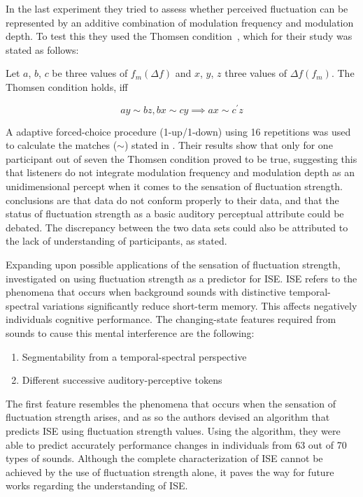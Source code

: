 \documentclass[../main.tex]{subfiles}
\begin{document}
\begin{theoreticalbackground}
In the last experiment they tried to assess whether perceived fluctuation can be
represented by an additive combination of modulation frequency and modulation
depth. To test this they used the Thomsen condition~\cite{Falmagne1976}, which
for their study was stated as follows:

\begin{mdframed}

  Let $a$, $b$, $c$ be three values of $f_m(\Delta f)$ and $x$, $y$, $z$ three
  values of $\Delta f(f_m)$. The Thomsen condition holds, iff

  \begin{equation}
    ay \sim bz, bx \sim cy \implies ax \sim c^{\prime} z
    \label{eq:thomsen}
  \end{equation}

\end{mdframed}

A adaptive forced-choice procedure (1-up/1-down) using 16 repetitions was used to
calculate the matches ($\sim$) stated in . Their results show
that only for one participant out of seven the Thomsen condition proved to be
true, suggesting this  that listeners do not integrate modulation frequency and
modulation depth as an unidimensional percept when it comes to the sensation of
fluctuation strength. \citeauthor{Wickelmaier2004Scaling} conclusions are that
\citeauthor{Fastl2007Psychoacoustics} data do not conform properly to their
data, and that the status of fluctuation strength as a basic auditory perceptual
attribute could be debated. The discrepancy between the two data sets could also
be attributed to the lack of understanding of participants, as
\citeauthor{Accolti2009Fluctuation} stated.

Expanding upon possible applications of the sensation of fluctuation strength,
\textcite{Schlittmeier2012} investigated on using fluctuation strength as a
predictor for \gls{ISE}. \gls{ISE} refers to the phenomena that occurs when
background sounds with distinctive temporal-spectral variations significantly
reduce short-term memory. This affects negatively individuals cognitive
performance. The changing-state features required from sounds to cause this
mental interference are the following:
\begin{enumerate}
  \item Segmentability from a temporal-spectral perspective
  \item Different successive auditory-perceptive tokens
\end{enumerate}

The first feature resembles the phenomena that occurs when the sensation of
fluctuation strength arises, and as so the authors devised an algorithm that
predicts \gls{ISE} using fluctuation strength values. Using the algorithm, they
were able to predict accurately performance changes in individuals from 63 out
of 70 types of sounds. Although the complete characterization of \gls{ISE}
cannot be achieved by the use of fluctuation strength alone, it paves the way
for future works regarding the understanding of \gls{ISE}.

\end{theoreticalbackground}
\end{document}
